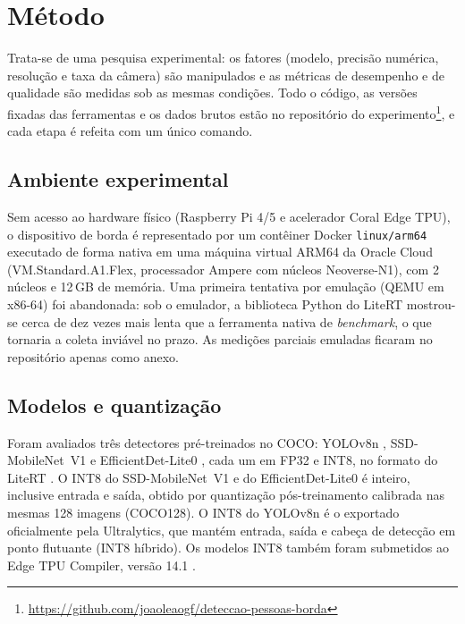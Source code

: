 \section{Método}
\label{desenvolvimento}

Trata-se de uma pesquisa experimental: os fatores (modelo, precisão numérica, resolução e taxa da câmera) são manipulados e as métricas de desempenho e de qualidade são medidas sob as mesmas condições. Todo o código, as versões fixadas das ferramentas e os dados brutos estão no repositório do experimento\footnote{\url{https://github.com/joaoleaogf/deteccao-pessoas-borda}}, e cada etapa é refeita com um único comando.

\subsection{Ambiente experimental}

Sem acesso ao hardware físico (Raspberry Pi 4/5 e acelerador Coral Edge TPU), o dispositivo de borda é representado por um contêiner Docker \texttt{linux/arm64} executado de forma nativa em uma máquina virtual ARM64 da Oracle Cloud (VM.Standard.A1.Flex, processador Ampere com núcleos Neoverse-N1), com 2 núcleos e 12\,GB de memória. Uma primeira tentativa por emulação (QEMU em x86-64) foi abandonada: sob o emulador, a biblioteca Python do LiteRT mostrou-se cerca de dez vezes mais lenta que a ferramenta nativa de \textit{benchmark}, o que tornaria a coleta inviável no prazo. As medições parciais emuladas ficaram no repositório apenas como anexo.

\subsection{Modelos e quantização}

Foram avaliados três detectores pré-treinados no COCO: YOLOv8n \citep{jocher2023yolo}, SSD-MobileNet~V1 \citep{liu2016ssd,howard2017mobilenets} e EfficientDet-Lite0 \citep{tan2020efficientdet}, cada um em FP32 e INT8, no formato do LiteRT \citep{litert2026}. O INT8 do SSD-MobileNet~V1 e do EfficientDet-Lite0 é inteiro, inclusive entrada e saída, obtido por quantização pós-treinamento \citep{jacob2018quantization} calibrada nas mesmas 128 imagens (COCO128). O INT8 do YOLOv8n é o exportado oficialmente pela Ultralytics, que mantém entrada, saída e cabeça de detecção em ponto flutuante (INT8 híbrido). Os modelos INT8 também foram submetidos ao Edge TPU Compiler, versão 14.1 \citep{coral2026compiler}.

